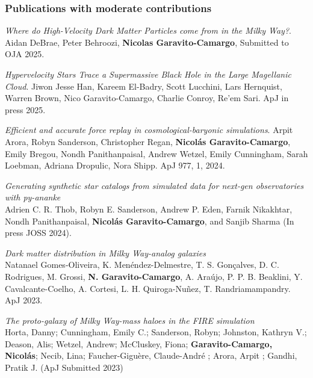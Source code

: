 \documentclass[14pt]{article}
\begin{document}
\subsubsection*{Publications with moderate contributions}

\begin{etaremune}
  \setcounter{enumi}{15}

\item \textit{Where do High-Velocity Dark Matter Particles come from in the
  Milky Way?}. Aidan DeBrae, Peter Behroozi, \textbf{Nicolas Garavito-Camargo},
  Submitted to OJA 2025.

\item \textit{Hypervelocity Stars Trace a Supermassive Black Hole in the Large
  Magellanic Cloud}. Jiwon Jesse Han, Kareem El-Badry, Scott Lucchini, Lars
  Hernquist, Warren Brown, Nico Garavito-Camargo, Charlie Conroy, Re'em Sari.
  ApJ in press 2025. 

\item \textit{Efficient and accurate force replay in cosmological-baryonic
  simulations}. Arpit Arora, Robyn Sanderson, Christopher Regan, \textbf{Nicol\'as
  Garavito-Camargo}, Emily Bregou, Nondh Panithanpaisal, Andrew Wetzel, Emily
  Cunningham, Sarah Loebman, Adriana Dropulic, Nora Shipp. ApJ 977, 1, 2024. 


\item \textit{Generating synthetic star catalogs from simulated data for next-gen observatories with py-ananke}\\
  Adrien C. R. Thob, Robyn E. Sanderson, Andrew P. Eden, Farnik
  Nikakhtar, Nondh Panithanpaisal, \textbf{Nicol\'as Garavito-Camargo},
  and Sanjib Sharma (In press JOSS 2024).

\item \textit{Dark matter distribution in Milky Way-analog galaxies}\\ 
 Natanael Gomes-Oliveira, K. Menéndez-Delmestre, T. S. Gonçalves, D. C.
 Rodrigues, M. Grossi, \textbf{N. Garavito-Camargo}, A. Araújo, P. P. B. Beaklini, Y.
 Cavalcante-Coelho, A. Cortesi, L. H. Quiroga-Nuñez, T. Randriamampandry. ApJ 2023.

\item \textit{The proto-galaxy of Milky Way-mass haloes in the FIRE simulation}
  \\ Horta, Danny; Cunningham, Emily C.; Sanderson, Robyn; Johnston, Kathryn V.;
  Deason, Alis; Wetzel, Andrew; McCluskey, Fiona; \textbf{Garavito-Camargo,
  Nicol\'as}; Necib, Lina; Faucher-Giguère, 
  Claude-André ; Arora, Arpit ; Gandhi, Pratik J. (ApJ Submitted 2023)\\


\end{etaremune}
\end{document}
